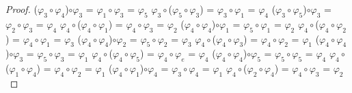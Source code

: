 \documentclass[10pt,a4paper,oneside]{article}
\begin{document}
\begin{proof}
				\newline
				($\varphi_{3}\circ\varphi_{4}$)$\circ\varphi_{3}$ = $\varphi_{1}\circ\varphi_{3}$ = $\varphi_{5}$
				\newline
				\newline
				$\varphi_{3}\circ$($\varphi_{5}\circ\varphi_{3}$) = $\varphi_{3}\circ\varphi_{1}$ = $\varphi_{4}$
				\newline
				($\varphi_{3}\circ\varphi_{5}$)$\circ\varphi_{3}$ = $\varphi_{2}\circ\varphi_{3}$ = $\varphi_{4}$
				\newline
				\newline
				$\varphi_{4}\circ$($\varphi_{4}\circ\varphi_{1}$) = $\varphi_{4}\circ\varphi_{3}$ = $\varphi_{2}$
				\newline
				($\varphi_{4}\circ\varphi_{4}$)$\circ\varphi_{1}$ = $\varphi_{5}\circ\varphi_{1}$ = $\varphi_{2}$
				\newline
				\newline
				$\varphi_{4}\circ$($\varphi_{4}\circ\varphi_{2}$) = $\varphi_{4}\circ\varphi_{1}$ = $\varphi_{3}$
				\newline
				($\varphi_{4}\circ\varphi_{4}$)$\circ\varphi_{2}$ = $\varphi_{5}\circ\varphi_{2}$ = $\varphi_{3}$
				\newline
				\newline
				$\varphi_{4}\circ$($\varphi_{4}\circ\varphi_{3}$) = $\varphi_{4}\circ\varphi_{2}$ = $\varphi_{1}$
				\newline
				($\varphi_{4}\circ\varphi_{4}$)$\circ\varphi_{3}$ = $\varphi_{5}\circ\varphi_{3}$ = $\varphi_{1}$
				\newline
				\newline
				$\varphi_{4}\circ$($\varphi_{4}\circ\varphi_{5}$) = $\varphi_{4}\circ\varphi_{e}$ = $\varphi_{4}$
				\newline
				($\varphi_{4}\circ\varphi_{4}$)$\circ\varphi_{5}$ = $\varphi_{5}\circ\varphi_{5}$ = $\varphi_{4}$
				\newline
				\newline
				$\varphi_{4}\circ$($\varphi_{1}\circ\varphi_{4}$) = $\varphi_{4}\circ\varphi_{2}$ = $\varphi_{1}$
				\newline
				($\varphi_{4}\circ\varphi_{1}$)$\circ\varphi_{4}$ = $\varphi_{3}\circ\varphi_{4}$ = $\varphi_{1}$
				\newline
				\newline
				$\varphi_{4}\circ$($\varphi_{2}\circ\varphi_{4}$) = $\varphi_{4}\circ\varphi_{3}$ = $\varphi_{2}$
				\newline

\end{proof}
\end{document}

